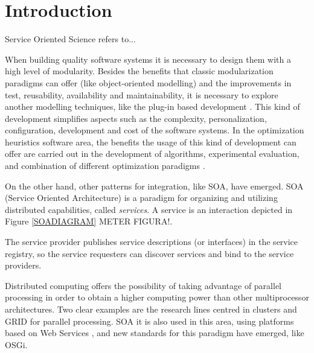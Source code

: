 \documentclass{sig-alternate}
\begin{document}


%
%
\section{Introduction}
\label{sec:intro}
%

Service Oriented Science refers to...


When building quality software systems it is necessary to design them
with a high level of modularity. Besides the benefits that classic
modularization paradigms can offer (like object-oriented modelling)
and the improvements in test, reusability, availability and
maintainability, it is necessary to explore another modelling techniques, like the
plug-in based development \cite{PLUGINS}. This kind of development
simplifies aspects such as the complexity, personalization, configuration,
development and cost of the software systems. In the optimization
heuristics software area, the benefits the usage of this kind of
development can offer are carried out in the development of algorithms,
experimental evaluation, and combination of different optimization
paradigms \cite{PLUGINS}.  

On the other hand, other patterns for integration, like SOA, have emerged. SOA (Service Oriented Architecture) \cite{PAPAZOGLOU} is a paradigm for
organizing and utilizing distributed capabilities, called {\em services}. A service is an interaction depicted in Figure \ref{SOADIAGRAM} METER FIGURA!.




The service provider publishes service descriptions (or interfaces) in the service registry, so the service requesters can discover services and bind to the service providers.



Distributed computing offers the possibility of taking advantage of parallel processing
 in order to obtain a higher 
computing power than other multiprocessor architectures. Two clear examples are the
research lines centred in clusters \cite{Buyya} and GRID \cite{OPENSCIENCEGRID}
for parallel processing. SOA it is also used in this area, using platforms based on Web Services \cite{PAPAZOGLOU}, and new standards for this paradigm have emerged, like OSGi.
\end{document}

